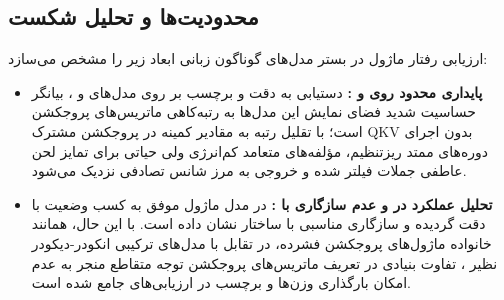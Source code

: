 \subsection{محدودیت‌ها و تحلیل شکست}
ارزیابی رفتار ماژول در بستر مدل‌های گوناگون زبانی ابعاد زیر را مشخص می‌سازد:
\begin{itemize}
    \item \textbf{پایداری محدود روی  و :} دستیابی به دقت  و برچسب  بر روی مدل‌های  و ، بیانگر حساسیت شدید فضای نمایش این مدل‌ها به رتبه‌کاهی ماتریس‌های پروجکشن است؛ با تقلیل رتبه به مقادیر کمینه در پروجکشن مشترک QKV بدون اجرای دوره‌های ممتد ریزتنظیم، مؤلفه‌های متعامد کم‌انرژی ولی حیاتی برای تمایز لحن عاطفی جملات فیلتر شده و خروجی به مرز شانس تصادفی نزدیک می‌شود.
    \item \textbf{تحلیل عملکرد در  و عدم سازگاری با :} در مدل  ماژول موفق به کسب وضعیت  با دقت  گردیده و سازگاری مناسبی با ساختار  نشان داده است. با این حال، همانند خانواده ماژول‌های پروجکشن فشرده، در تقابل با مدل‌های ترکیبی انکودر-دیکودر نظیر ، تفاوت بنیادی در تعریف ماتریس‌های پروجکشن توجه متقاطع منجر به عدم امکان بارگذاری وزن‌ها و برچسب  در ارزیابی‌های جامع شده است.
\end{itemize}
